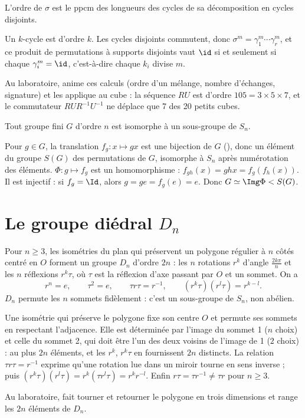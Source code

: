 \begin{proposition}
L'ordre de $\sigma$ est le ppcm des longueurs des cycles de sa décomposition en cycles disjoints.
\end{proposition}
\begin{preuve}
Un $k$-cycle est d'ordre $k$. Les cycles disjoints commutent, donc $\sigma^m=\gamma_1^m\cdots\gamma_r^m$, et ce produit de permutations à supports disjoints vaut $\id$ si et seulement si chaque $\gamma_i^m=\id$, c'est-à-dire chaque $k_i$ divise $m$.
\end{preuve}
Au laboratoire,  anime ces calculs (ordre d'un mélange, nombre d'échanges, signature) et  les applique au cube : la séquence $RU$ est d'ordre $105=3\times5\times7$, et le commutateur $RUR^{-1}U^{-1}$ ne déplace que 7 des 20 petits cubes.
\begin{theoreme}[Cayley]\label{thm-cayley}
Tout groupe fini $G$ d'ordre $n$ est isomorphe à un sous-groupe de $S_n$.
\end{theoreme}
\begin{preuve}
Pour $g\in G$, la translation $f_g:x\mapsto gx$ est une bijection de $G$ (), donc un élément du groupe $S(G)$ des permutations de $G$, isomorphe à $S_n$ après numérotation des éléments. $\Phi:g\mapsto f_g$ est un homomorphisme : $f_{gh}(x)=ghx=f_g(f_h(x))$. Il est injectif : si $f_g=\Id$, alors $g=ge=f_g(e)=e$. Donc $G\simeq\Img\Phi<S(G)$.
\end{preuve}

\section{Le groupe diédral $D_n$}
\begin{proposition}\label{prop-diedral}
Pour $n\ge3$, les isométries du plan qui préservent un polygone régulier à $n$ côtés centré en $O$ forment un groupe $D_n$ d'ordre $2n$ : les $n$ rotations $r^k$ d'angle $\frac{2k\pi}n$ et les $n$ réflexions $r^k\tau$, où $\tau$ est la réflexion d'axe passant par $O$ et un sommet. On a
\[r^n=e,\qquad\tau^2=e,\qquad\tau r\tau=r^{-1},\qquad(r^k\tau)(r^l\tau)=r^{k-l}.\]
$D_n$ permute les $n$ sommets fidèlement : c'est un sous-groupe de $S_n$, non abélien.
\end{proposition}
\begin{preuve}
Une isométrie qui préserve le polygone fixe son centre $O$ et permute ses sommets en respectant l'adjacence. Elle est déterminée par l'image du sommet 1 ($n$ choix) et celle du sommet 2, qui doit être l'un des deux voisins de l'image de 1 ($2$ choix) : au plus $2n$ éléments, et les $r^k$, $r^k\tau$ en fournissent $2n$ distincts. La relation $\tau r\tau=r^{-1}$ exprime qu'une rotation lue dans un miroir tourne en sens inverse ; puis $(r^k\tau)(r^l\tau)=r^k(\tau r^l\tau)=r^kr^{-l}$. Enfin $r\tau=\tau r^{-1}\neq\tau r$ pour $n\ge3$.
\end{preuve}
Au laboratoire,  fait tourner et retourner le polygone en trois dimensions et range les $2n$ éléments de $D_n$.

